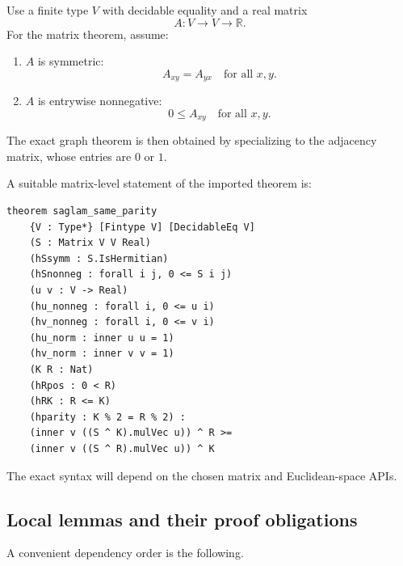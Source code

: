 \documentclass[11pt]{article}
\newcommand{\RR}{\mathbb{R}}
\newcommand{\1}{\mathbf{1}}
\begin{document}
Use a finite type $V$ with decidable equality and a real matrix
\[
  A:V\to V\to\RR.
\]
For the matrix theorem, assume:
\begin{enumerate}[label=(A\arabic*)]
\item $A$ is symmetric:
  \[
    A_{xy}=A_{yx}\quad\text{for all }x,y.
  \]
\item $A$ is entrywise nonnegative:
  \[
    0\le A_{xy}\quad\text{for all }x,y.
  \]
\end{enumerate}
The exact graph theorem is then obtained by specializing to the adjacency
matrix, whose entries are $0$ or $1$.

A suitable matrix-level statement of the imported theorem is:
\begin{verbatim}
theorem saglam_same_parity
    {V : Type*} [Fintype V] [DecidableEq V]
    (S : Matrix V V Real)
    (hSsymm : S.IsHermitian)
    (hSnonneg : forall i j, 0 <= S i j)
    (u v : V -> Real)
    (hu_nonneg : forall i, 0 <= u i)
    (hv_nonneg : forall i, 0 <= v i)
    (hu_norm : inner u u = 1)
    (hv_norm : inner v v = 1)
    (K R : Nat)
    (hRpos : 0 < R)
    (hRK : R <= K)
    (hparity : K % 2 = R % 2) :
    (inner v ((S ^ K).mulVec u)) ^ R >=
    (inner v ((S ^ R).mulVec u)) ^ K
\end{verbatim}
The exact syntax will depend on the chosen matrix and Euclidean-space APIs.

\subsection{Local lemmas and their proof obligations}

A convenient dependency order is the following.
\end{document}
